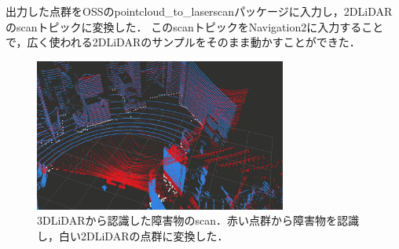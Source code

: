出力した点群をOSSのpointcloud\_to\_laserscan\cite{laserscan}パッケージに入力し，2DLiDARのscanトピックに変換した．
このscanトピックをNavigation2に入力することで，広く使われる2DLiDARのサンプルをそのまま動かすことができた．

\begin{figure}[t]
    \centering
    \includegraphics[height=5cm]{fig/obstaclescan.png}
    \caption{3DLiDARから認識した障害物のscan．赤い点群から障害物を認識し，白い2DLiDARの点群に変換した．}
    \label{fig:obstaclescan}
\end{figure}